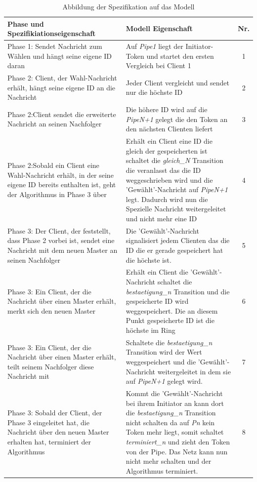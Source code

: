 \begin{table}
\begin{tabular}{|p{}|p{}|c|}
\hline Phase und Spezifikiationseigenschaft & Modell Eigenschaft & Nr.\\ 
\hline Phase 1: Sendet Nachricht zum Wählen und hängt seine eigene ID daran & Auf \textit{Pipe1} liegt der Initiator-Token und startet den ersten Vergleich bei Client 1   & 1\\ 
\hline Phase 2: Client, der Wahl-Nachricht erhält, hängt seine eigene ID an die Nachricht & Jeder Client vergleicht und sendet nur die höchste ID & 2\\
\hline Phase 2:Client sendet die erweiterte Nachricht an seinen Nachfolger & Die höhere ID wird auf die \textit{PipeN+1} gelegt die den Token an den nächsten Clienten liefert & 3\\
\hline Phase 2:Sobald ein Client eine Wahl-Nachricht erhält, in der seine eigene ID bereits enthalten ist, geht der Algorithmus in Phase 3 über & Erhält ein Client eine ID die gleich der gespeicherten ist schaltet die \textit{gleich\_N} Transition die veranlasst das die ID weggeschrieben wird und die 'Gewählt'-Nachricht auf \textit{PipeN+1} legt. Dadurch wird nun die Spezielle Nachricht weitergeleitet und nicht mehr eine ID & 4\\
\hline Phase 3: Der Client, der feststellt, dass Phase 2 vorbei ist, sendet eine Nachricht mit dem neuen Master an seinen Nachfolger &  Die 'Gewählt'-Nachricht signalisiert jedem Clienten das die ID die er gerade gespeichert hat die höchste ist.  &5\\
\hline Phase 3: Ein Client, der die Nachricht über einen Master erhält, merkt sich den neuen Master & Erhält ein Client die 'Gewählt'-Nachricht schaltet die \textit{bestaetigung\_n} Transition und die gespeicherte ID wird weggespeichert. Die an diesem Punkt gespeicherte ID ist die höchste im Ring &6\\ 
\hline Phase 3: Ein Client, der die Nachricht über einen Master erhält, teilt seinem Nachfolger diese Nachricht mit & Schaltete die \textit{bestaetigung\_n} Transition wird der Wert weggespeichert und die 'Gewählt'-Nachricht weitergeleitet in dem sie auf \textit{PipeN+1} gelegt wird. & 7\\
\hline Phase 3: Sobald der Client, der Phase 3 eingeleitet hat, die Nachricht über den neuen Master erhalten hat, terminiert der Algorithmus & Kommt die 'Gewählt'-Nachricht bei ihrem Initiator an kann dort die \textit{bestaetigung\_n} Transition nicht schalten da auf \textit{Pn} kein Token mehr liegt, somit schaltet \textit{terminiert\_n} und zieht den Token von der Pipe. Das Netz kann nun nicht mehr schalten und der Algorithmus terminiert. &8\\
\hline 
\end{tabular}
\caption{Abbildung der Spezifikation auf das Modell}
\label{table: speci_modell} 
\end{table}

